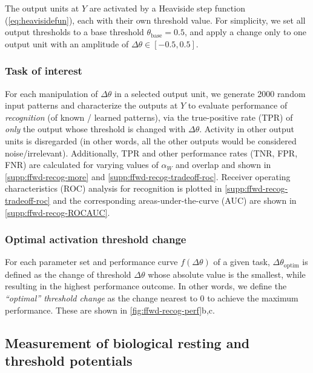 The output units at $Y$ are activated by a Heaviside step function (\autoref{eq:heavisidefun}),
    each with their own threshold value.
    For simplicity, we set all output thresholds
        to a base threshold $\theta_{\text{base}} = 0.5$,
        and apply a change only to one output unit with an amplitude of $\Delta \theta \in [-0.5,0.5]$.

\subsubsection*{Task of interest}

For each manipulation of $\Delta \theta$ in a selected output unit,
        we generate 2000 random input patterns
        and characterize the outputs at $Y$ to evaluate performance of \textit{recognition} (of known / learned patterns),
        via the true-positive rate (TPR) of \textit{only} the output whose threshold is changed with $\Delta \theta$.
    Activity in other output units is disregarded
        (in other words, all the other outputs would be considered noise/irrelevant).
    Additionally, TPR and other performance rates (TNR, FPR, FNR) are calculated
        for varying values of $\alpha_W$ and overlap
        and shown in \autoref{supp:ffwd-recog-more}
        and \autoref{supp:ffwd-recog-tradeoff-roc}.
    Receiver operating characteristics (ROC) analysis for recognition is plotted
            in \autoref{supp:ffwd-recog-tradeoff-roc}
        and the corresponding areas-under-the-curve (AUC) are shown
            in \autoref{supp:ffwd-recog-ROCAUC}.

\subsubsection*{Optimal activation threshold change}

For each parameter set and performance curve $f(\Delta \theta)$ of a given task,
    $\Delta \theta_{\text{optim}}$ is defined as the change of threshold $\Delta \theta$
        whose absolute value is the smallest,
        while resulting in the highest performance outcome.
    In other words, we define the \textit{``optimal'' threshold change}
        as the change nearest to 0 to achieve the maximum performance.
    These are shown in \autoref{fig:ffwd-recog-perf}b,c.

\subsection{Measurement of biological resting and threshold potentials}

